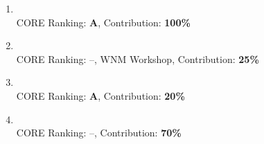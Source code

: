 \begin{enumerate}
  \item {} \\
  \textbullet\enspace CORE Ranking: \textbf{A}, Contribution: \textbf{100\%}
  
  \item {} \\
  \textbullet\enspace CORE Ranking: --, WNM Workshop, Contribution: \textbf{25\%} %
  
  \item {} \\
  \textbullet\enspace CORE Ranking: \textbf{A}, Contribution: \textbf{20\%}
  
  \item {} \\
  \textbullet\enspace CORE Ranking: --, Contribution: \textbf{70\%}
\end{enumerate}

